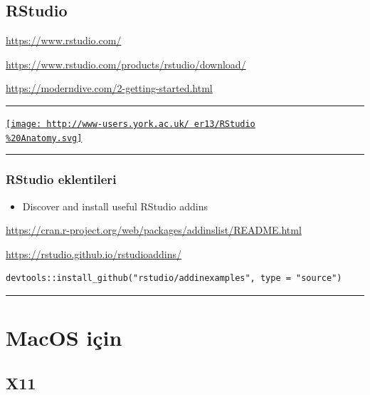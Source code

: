 \documentclass[]{article}
\providecommand{\tightlist}{%
  \setlength{\itemsep}{0pt}\setlength{\parskip}{0pt}}
\begin{document}
\hypertarget{rstudio-1}{%
\subsection{RStudio}\label{rstudio-1}}

\url{https://www.rstudio.com/}

\url{https://www.rstudio.com/products/rstudio/download/}

\url{https://moderndive.com/2-getting-started.html}

\begin{center}\rule{0.5\linewidth}{\linethickness}\end{center}

\href{https://buzzrbeeline.blog/2018/07/04/rstudio-anatomy/}{\texttt{[image: http://www-users.york.ac.uk/~er13/RStudio\\\%20Anatomy.svg]}}

\begin{center}\rule{0.5\linewidth}{\linethickness}\end{center}

\hypertarget{rstudio-eklentileri}{%
\subsubsection{RStudio eklentileri}\label{rstudio-eklentileri}}

\begin{itemize}
\tightlist
\item
  Discover and install useful RStudio addins
\end{itemize}

\url{https://cran.r-project.org/web/packages/addinslist/README.html}

\url{https://rstudio.github.io/rstudioaddins/}

\begin{verbatim}
devtools::install_github("rstudio/addinexamples", type = "source")
\end{verbatim}

\begin{center}\rule{0.5\linewidth}{\linethickness}\end{center}

\hypertarget{macos-icin}{%
\section{MacOS için}\label{macos-icin}}

\hypertarget{x11}{%
\subsection{X11}\label{x11}}
\end{document}
